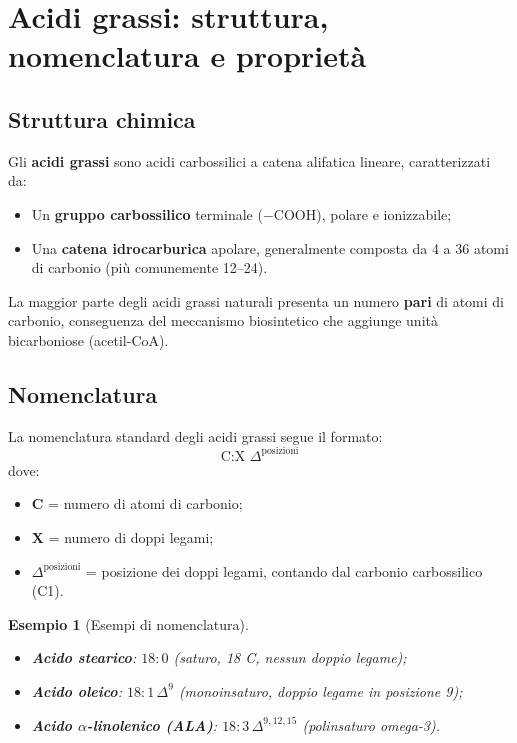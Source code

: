 \documentclass[12pt,a4paper]{report}
\newtheorem{esempio}{Esempio}[section]
\begin{document}
\section{Acidi grassi: struttura, nomenclatura e proprietà}
\subsection{Struttura chimica}
Gli \textbf{acidi grassi} sono acidi carbossilici a catena alifatica lineare, caratterizzati da:
\begin{itemize}
\item Un \textbf{gruppo carbossilico} terminale (\(-\mathrm{COOH}\)), polare e ionizzabile;
\item Una \textbf{catena idrocarburica} apolare, generalmente composta da 4 a 36 atomi di carbonio (più comunemente 12--24).
\end{itemize}
La maggior parte degli acidi grassi naturali presenta un numero \textbf{pari} di atomi di carbonio, conseguenza del meccanismo biosintetico che aggiunge unità bicarboniose (acetil-CoA).
\subsection{Nomenclatura}
La nomenclatura standard degli acidi grassi segue il formato:
\[
\text{C:X } \Delta^{\text{posizioni}}
\]
dove:
\begin{itemize}
\item \textbf{C} = numero di atomi di carbonio;
\item \textbf{X} = numero di doppi legami;
\item \textbf{\(\Delta^{\text{posizioni}}\)} = posizione dei doppi legami, contando dal carbonio carbossilico (C1).
\end{itemize}
\begin{esempio}[Esempi di nomenclatura]
\begin{itemize}
\item \textbf{Acido stearico}: \(18:0\) (saturo, 18 C, nessun doppio legame);
\item \textbf{Acido oleico}: \(18:1\,\Delta^9\) (monoinsaturo, doppio legame in posizione 9);
\item \textbf{Acido \(\alpha\)-linolenico (ALA)}: \(18:3\,\Delta^{9,12,15}\) (polinsaturo omega-3).
\end{itemize}
\end{esempio}
\end{document}
